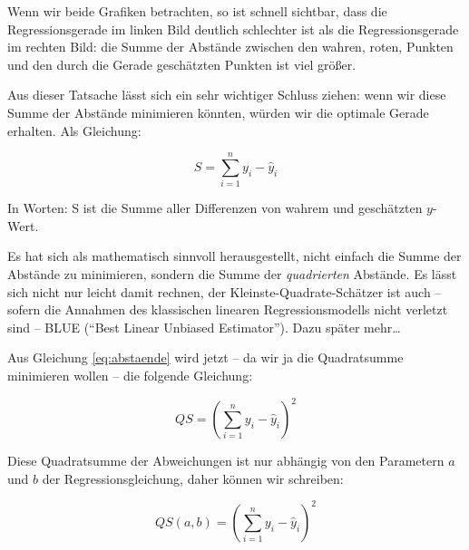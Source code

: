 \documentclass[ngerman, 12pt]{scrartcl}
\def\sm{\sum\limits_{i=1}^{n}}
\begin{document}
\label{fig:geraden2}

Wenn wir beide Grafiken betrachten, so ist schnell sichtbar, dass die Regressionsgerade im linken Bild deutlich schlechter ist als die Regressionsgerade im rechten Bild: die Summe der Abstände zwischen den wahren, roten, Punkten und den durch die Gerade geschätzten Punkten ist viel größer.


Aus dieser Tatsache lässt sich ein sehr wichtiger Schluss ziehen: wenn wir diese Summe der Abstände minimieren könnten, würden wir die optimale Gerade erhalten. Als Gleichung:

\begin{equation}
S = \sm y_i - \hat{y}_i
\end{equation}\label{eq:abstaende}

In Worten: S ist die Summe aller Differenzen von wahrem und geschätzten $y$-Wert.

Es hat sich als mathematisch sinnvoll herausgestellt, nicht einfach die Summe der Abstände zu minimieren, sondern die Summe der \textit{quadrierten} Abstände. Es lässt sich nicht nur leicht damit rechnen, der Kleinste-Quadrate-Schätzer ist auch -- sofern die  Annahmen des klassischen linearen Regressionsmodells nicht verletzt sind -- BLUE (\enquote{Best Linear Unbiased Estimator}). Dazu später mehr\ldots

Aus Gleichung \ref{eq:abstaende} wird jetzt -- da wir ja die Quadratsumme minimieren wollen -- die folgende Gleichung:

\begin{equation}
QS = \left(\sm y_i - \hat{y}_i\right)^2
\end{equation}\label{eq:qabstaende}

Diese Quadratsumme der Abweichungen ist nur abhängig von den Parametern \(a\) und \(b\) der Regressionsgleichung, daher können wir schreiben:

\begin{equation}
QS(a,b) = \left(\sm y_i - \hat{y}_i\right)^2
\end{equation}\label{eq:qabstaende}


\end{document}
